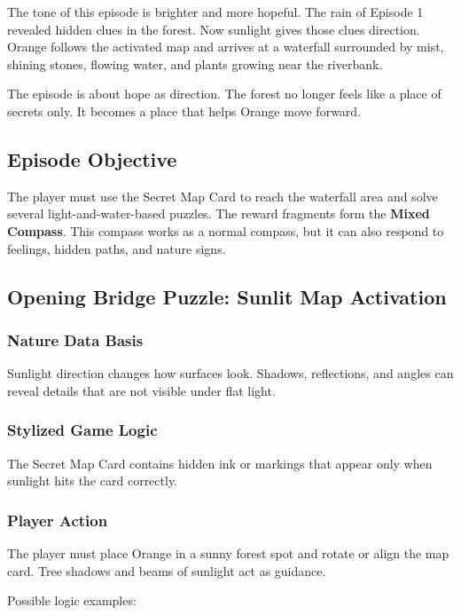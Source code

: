 \documentclass[12pt]{article}
\begin{document}
The tone of this episode is brighter and more hopeful. The rain of Episode 1 revealed hidden clues in the forest. Now sunlight gives those clues direction. Orange follows the activated map and arrives at a waterfall surrounded by mist, shining stones, flowing water, and plants growing near the riverbank.

The episode is about hope as direction. The forest no longer feels like a place of secrets only. It becomes a place that helps Orange move forward.

\subsection{Episode Objective}

The player must use the Secret Map Card to reach the waterfall area and solve several light-and-water-based puzzles. The reward fragments form the \textbf{Mixed Compass}. This compass works as a normal compass, but it can also respond to feelings, hidden paths, and nature signs.

\subsection{Opening Bridge Puzzle: Sunlit Map Activation}

\subsubsection{Nature Data Basis}

Sunlight direction changes how surfaces look. Shadows, reflections, and angles can reveal details that are not visible under flat light.

\subsubsection{Stylized Game Logic}

The Secret Map Card contains hidden ink or markings that appear only when sunlight hits the card correctly.

\subsubsection{Player Action}

The player must place Orange in a sunny forest spot and rotate or align the map card. Tree shadows and beams of sunlight act as guidance.

Possible logic examples:
\end{document}
